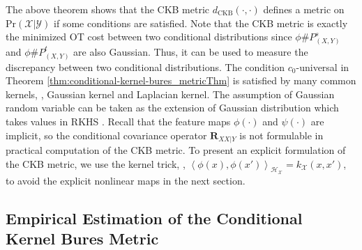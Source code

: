 \documentclass[final]{cvpr}
\newcommand{\MC}{\mathcal}
\newcommand{\MBF}{\mathbf}
\begin{document}
The above theorem shows that the CKB metric $d_{\text{CKB}}(\cdot,\cdot)$ defines a metric on $\text{Pr}(\MC{X|Y})$ if some conditions are satisfied. Note that the CKB metric is exactly the minimized OT cost between two conditional distributions since $\phi \# P^s_{(X,Y)}$ and $\phi \# P^t_{(X,Y)}$ are also Gaussian. Thus, it can be used to measure the discrepancy between two conditional distributions. The condition $c_0$-universal \cite{sriperumbudur2011universality} in Theorem \ref{thm:conditional-kernel-bures_metricThm} is satisfied by many common kernels, \eg, Gaussian kernel and Laplacian kernel. The assumption of Gaussian random variable can be taken as the extension of Gaussian distribution which takes values in RKHS \cite{klebanov2020rigorous}. Recall that the feature maps $\phi(\cdot)$ and $\psi(\cdot)$ are implicit, so the conditional covariance operator $\MBF{R}_{XX|Y}$ is not formulable in practical computation of the CKB metric. To present an explicit formulation of the CKB metric, we use the kernel trick, \ie, $\left<\phi(x),\phi(x')\right>_{\MC{H}_{\MC{X}}}=k_{\MC{X}}(x,x')$, to avoid the explicit nonlinear maps in the next section.

\subsection{Empirical Estimation of the Conditional Kernel Bures Metric}\label{subsec:empirical_estimation_ckb}
\end{document}
